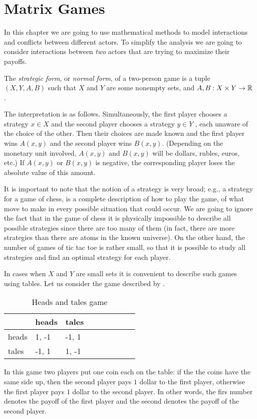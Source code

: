 \chapter{Matrix Games}
In this chapter we are going to use mathematical methods to model interactions
and conflicts between different actors. To simplify the analysis we are going to
consider interactions between \emph{two} actors that are trying to maximize
their payoffs.

\begin{definition}
  The \emph{strategic form}, or \emph{normal form}, of a two-person game is
  a tuple $(X, Y, A, B)$ such that $X$ and $Y$ are some nonempty sets, and 
  $A, B  : X \times Y \to {\mathbb{R}}$.
\end{definition}
The interpretation is as follows. Simultaneously, the first player chooses 
a strategy $x \in X$ and the second player chooses a strategy $y \in Y$ , each
unaware of the choice of the other. Then their choices are made known and the
first player wins $A(x, y)$ and the second player wins $B(x, y)$. (Depending on
the monetary unit involved, $A(x, y)$ and $B(x, y)$ will be dollars, rubles,
euros, etc.) If $A(x, y)$ or $B(x, y)$ is negative, the corresponding player
loses the absolute value of this amount.

It is important to note that the notion of a strategy is very broad; e.g., a
strategy for a game of chess, is a complete description of how to play the game,
of what move to make in every possible situation that could occur. We are going
to ignore the fact that in the game of chess it is physically impossible to
describe all possible strategies since there are too many of them (in fact,
there are more strategies than there are atoms in the known universe). On the
other hand, the number of games of tic tac toe is rather small, so that it is
possible to study all strategies and find an optimal strategy for each player.

In cases when $X$ and $Y$ are small sets it is convenient to describe such games
using tables. Let us consider the game described by
.
\begin{table}
  \begin{center}
    \begin{tabular}{l l l  l  l  l  l  l  l}
      \toprule
            & heads  & tales   \\
      \midrule
      heads & 1, -1 & -1, 1   \\
      tales & -1, 1 & 1, -1   \\
      \bottomrule
    \end{tabular}
  \end{center}
  \caption{Heads and tales game}
  \label{table:heads-and-tales-game}
\end{table}
In this game two players put one coin each on the table: if the the coins have
the same side up, then the second player pays $1$ dollar to the first player,
otherwise the first player pays $1$ dollar to the second player. In other words,
the firs number denotes the payoff of the first player and the second denotes
the payoff of the second player.

